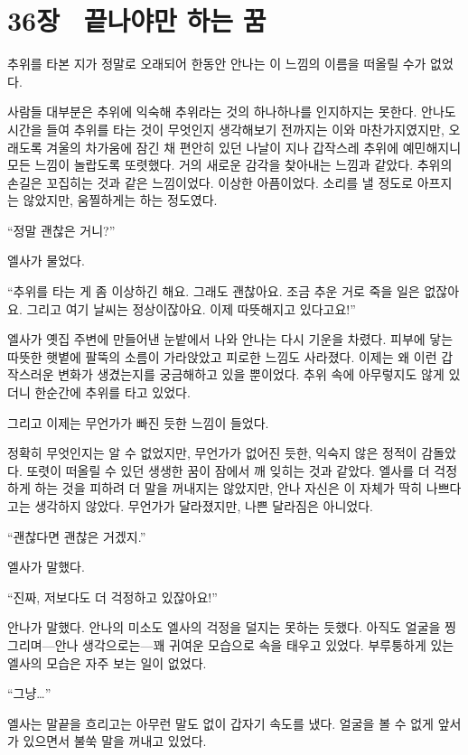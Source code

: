 

\chapter[36장  끝나야만 하는 꿈][36장\hspace*{.5em}끝나야만 하는 꿈]{36장 \ 끝나야만 하는 꿈}



추위를 타본 지가 정말로 오래되어 한동안 안나는 이 느낌의 이름을 떠올릴 수가 없었다.

사람들 대부분은 추위에 익숙해 추위라는 것의 하나하나를 인지하지는 못한다. 안나도 시간을 들여 추위를 타는 것이 무엇인지 생각해보기 전까지는 이와 마찬가지였지만, 오래도록 겨울의 차가움에 잠긴 채 편안히 있던 나날이 지나 갑작스레 추위에 예민해지니 모든 느낌이 놀랍도록 또렷했다. 거의 새로운 감각을 찾아내는 느낌과 같았다. 추위의 손길은 꼬집히는 것과 같은 느낌이었다. 이상한 아픔이었다. 소리를 낼 정도로 아프지는 않았지만, 움찔하게는 하는 정도였다.

``정말 괜찮은 거니?''

엘사가 물었다.

``추위를 타는 게 좀 이상하긴 해요. 그래도 괜찮아요. 조금 추운 거로 죽을 일은 없잖아요. 그리고 여기 날씨는 정상이잖아요. 이제 따뜻해지고 있다고요!''

엘사가 옛집 주변에 만들어낸 눈밭에서 나와 안나는 다시 기운을 차렸다. 피부에 닿는 따뜻한 햇볕에 팔뚝의 소름이 가라앉았고 피로한 느낌도 사라졌다. 이제는 왜 이런 갑작스러운 변화가 생겼는지를 궁금해하고 있을 뿐이었다. 추위 속에 아무렇지도 않게 있더니 한순간에 추위를 타고 있었다.

그리고 이제는 무언가가 빠진 듯한 느낌이 들었다.

정확히 무엇인지는 알 수 없었지만, 무언가가 없어진 듯한, 익숙지 않은 정적이 감돌았다. 또렷이 떠올릴 수 있던 생생한 꿈이 잠에서 깨 잊히는 것과 같았다. 엘사를 더 걱정하게 하는 것을 피하려 더 말을 꺼내지는 않았지만, 안나 자신은 이 자체가 딱히 나쁘다고는 생각하지 않았다. 무언가가 달라졌지만, 나쁜 달라짐은 아니었다.

``괜찮다면 괜찮은 거겠지.''

엘사가 말했다.

``진짜, 저보다도 더 걱정하고 있잖아요!''

안나가 말했다. 안나의 미소도 엘사의 걱정을 덜지는 못하는 듯했다. 아직도 얼굴을 찡그리며—안나 생각으로는—꽤 귀여운 모습으로 속을 태우고 있었다. 부루퉁하게 있는 엘사의 모습은 자주 보는 일이 없었다.

``그냥\ldots''

엘사는 말끝을 흐리고는 아무런 말도 없이 갑자기 속도를 냈다. 얼굴을 볼 수 없게 앞서 가 있으면서 불쑥 말을 꺼내고 있었다.

